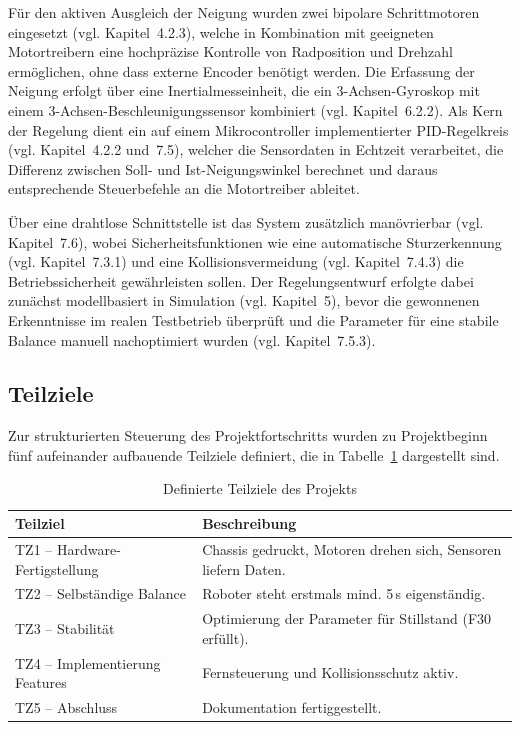 \documentclass[12pt,ngerman,numbers=noenddot,abstracton,headsepline]{scrreprt}
\begin{document}
Für den aktiven Ausgleich der Neigung wurden zwei bipolare Schrittmotoren eingesetzt (vgl. Kapitel~4.2.3), welche in Kombination mit geeigneten Motortreibern eine hochpräzise Kontrolle von Radposition und Drehzahl ermöglichen, ohne dass externe Encoder benötigt werden. Die Erfassung der Neigung erfolgt über eine Inertialmesseinheit, die ein 3-Achsen-Gyroskop mit einem 3-Achsen-Beschleunigungssensor kombiniert (vgl. Kapitel~6.2.2). Als Kern der Regelung dient ein auf einem Mikrocontroller implementierter PID-Regelkreis (vgl. Kapitel~4.2.2 und~7.5), welcher die Sensordaten in Echtzeit verarbeitet, die Differenz zwischen Soll- und Ist-Neigungswinkel berechnet und daraus entsprechende Steuerbefehle an die Motortreiber ableitet.

Über eine drahtlose Schnittstelle ist das System zusätzlich manövrierbar (vgl. Kapitel~7.6), wobei Sicherheitsfunktionen wie eine automatische Sturzerkennung (vgl. Kapitel~7.3.1) und eine Kollisionsvermeidung (vgl. Kapitel~7.4.3) die Betriebssicherheit gewährleisten sollen. Der Regelungsentwurf erfolgte dabei zunächst modellbasiert in Simulation (vgl. Kapitel~5), bevor die gewonnenen Erkenntnisse im realen Testbetrieb überprüft und die Parameter für eine stabile Balance manuell nachoptimiert wurden (vgl. Kapitel~7.5.3).

\subsection{Teilziele}
\label{subsec:teilziele}

Zur strukturierten Steuerung des Projektfortschritts wurden zu Projektbeginn fünf aufeinander aufbauende Teilziele definiert, die in Tabelle~\ref{tab:teilziele} dargestellt sind.

\begin{table}[h]
    \centering
    \caption{Definierte Teilziele des Projekts}
    \label{tab:teilziele}
    \begin{tabular}{|l|l|}
        \hline
        \textbf{Teilziel} & \textbf{Beschreibung} \\
        \hline
        TZ1 -- Hardware-Fertigstellung & Chassis gedruckt, Motoren drehen sich, Sensoren liefern Daten. \\
        \hline
        TZ2 -- Selbständige Balance & Roboter steht erstmals mind. 5\,s eigenständig. \\
        \hline
        TZ3 -- Stabilität & Optimierung der Parameter für Stillstand (F30 erfüllt). \\
        \hline
        TZ4 -- Implementierung Features & Fernsteuerung und Kollisionsschutz aktiv. \\
        \hline
        TZ5 -- Abschluss & Dokumentation fertiggestellt. \\
        \hline
    \end{tabular}
\end{table}
\end{document}
